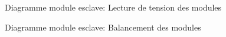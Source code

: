 		\begin{figure}[H]
			\centering
			\caption{Diagramme module esclave: Lecture de tension des modules}
			\label{fig:diagrammefonctionnelslavelecturedetension}
		\end{figure}

		\begin{figure}[H]
			\centering
			\caption{Diagramme module esclave: Balancement des modules}
			\label{fig:diagrammefonctionnelslavebalancement}
		\end{figure}

